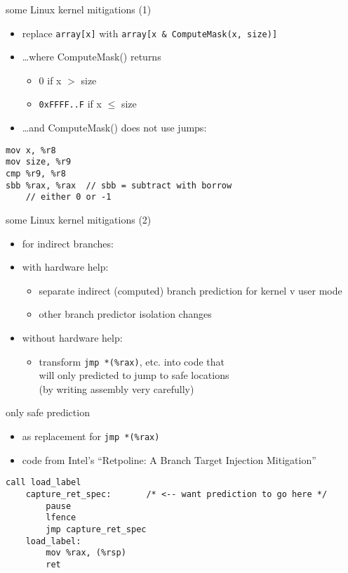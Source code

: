 \begin{frame}[fragile]{some Linux kernel mitigations (1)}
\begin{itemize}
\item replace \lstinline|array[x]| with \lstinline|array[x & ComputeMask(x, size)]|
\item \ldots where ComputeMask() returns
    \begin{itemize}
    \item 0 if x $>$ size
    \item \texttt{0xFFFF..F} if x $\le$ size
    \end{itemize}
\item \ldots and ComputeMask() does not use jumps:
\end{itemize}
\begin{lstlisting}[style=small,language=myasm]
mov x, %r8
mov size, %r9
cmp %r9, %r8
sbb %rax, %rax  // sbb = subtract with borrow
    // either 0 or -1
\end{lstlisting}
\end{frame}

\begin{frame}[fragile]{some Linux kernel mitigations (2)}
\begin{itemize}
\item for indirect branches:
\vspace{.5cm}
\item with hardware help:
    \begin{itemize}
    \item separate indirect (computed) branch prediction for kernel v user mode
    \item other branch predictor isolation changes
    \end{itemize}
\item without hardware help:
    \begin{itemize}
    \item transform \lstinline|jmp *(%rax)|, etc. into code that \\
        will only predicted to jump to safe locations \\
        (by writing assembly very carefully)
    \end{itemize}
\end{itemize}
\end{frame}

\begin{frame}[fragile]{only safe prediction}
\begin{itemize}
\item as replacement for \lstinline|jmp *(%rax)|
\item code from Intel's ``Retpoline: A Branch Target Injection Mitigation''
\end{itemize}
\begin{lstlisting}[language=myasm,style=small]
        call load_label
    capture_ret_spec:       /* <-- want prediction to go here */
        pause
        lfence
        jmp capture_ret_spec
    load_label:
        mov %rax, (%rsp)
        ret
\end{lstlisting}
\end{frame}
